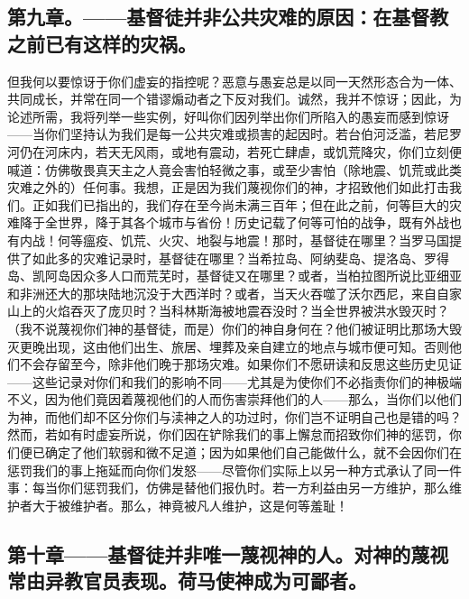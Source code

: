 
\subsection{第九章。——基督徒并非公共灾难的原因：在基督教之前已有这样的灾祸。}

但我何以要惊讶于你们虚妄的指控呢？恶意与愚妄总是以同一天然形态合为一体、共同成长，并常在同一个错谬煽动者之下反对我们。诚然，我并不惊讶；因此，为论述所需，我将列举一些实例，好叫你们因列举出你们所陷入的愚妄而感到惊讶——当你们坚持认为我们是每一公共灾难或损害的起因时。若台伯河泛滥，若尼罗河仍在河床内，若天无风雨，或地有震动，若死亡肆虐，或饥荒降灾，你们立刻便喊道：仿佛敬畏真天主之人竟会害怕轻微之事，或至少害怕（除地震、饥荒或此类灾难之外的）任何事。我想，正是因为我们蔑视你们的神，才招致他们如此打击我们。正如我们已指出的，我们存在至今尚未满三百年；但在此之前，何等巨大的灾难降于全世界，降于其各个城市与省份！历史记载了何等可怕的战争，既有外战也有内战！何等瘟疫、饥荒、火灾、地裂与地震！那时，基督徒在哪里？当罗马国提供了如此多的灾难记录时，基督徒在哪里？当希拉岛、阿纳斐岛、提洛岛、罗得岛、凯阿岛因众多人口而荒芜时，基督徒又在哪里？或者，当柏拉图所说比亚细亚和非洲还大的那块陆地沉没于大西洋时？或者，当天火吞噬了沃尔西尼，来自自家山上的火焰吞灭了庞贝时？当科林斯海被地震吞没时？当全世界被洪水毁灭时？（我不说蔑视你们神的基督徒，而是）你们的神自身何在？他们被证明比那场大毁灭更晚出现，这由他们出生、旅居、埋葬及亲自建立的地点与城市便可知。否则他们不会存留至今，除非他们晚于那场灾难。如果你们不愿研读和反思这些历史见证——这些记录对你们和我们的影响不同——尤其是为使你们不必指责你们的神极端不义，因为他们竟因着蔑视他们的人而伤害崇拜他们的人——那么，当你们以他们为神，而他们却不区分你们与渎神之人的功过时，你们岂不证明自己也是错的吗？然而，若如有时虚妄所说，你们因在铲除我们的事上懈怠而招致你们神的惩罚，你们便已确定了他们软弱和微不足道；因为如果他们自己能做什么，就不会因你们在惩罚我们的事上拖延而向你们发怒——尽管你们实际上以另一种方式承认了同一件事：每当你们惩罚我们，仿佛是替他们报仇时。若一方利益由另一方维护，那么维护者大于被维护者。那么，神竟被凡人维护，这是何等羞耻！\par


\subsection{第十章——基督徒并非唯一蔑视神的人。对神的蔑视常由异教官员表现。荷马使神成为可鄙者。}

